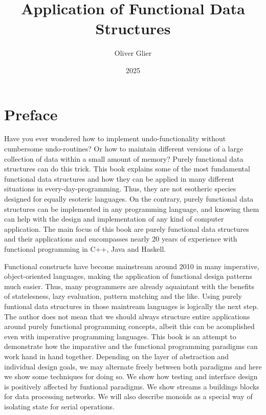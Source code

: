 \documentclass{book}
\title{Application of Functional Data Structures}
\author{Oliver Glier}
\date{2025}
\begin{document}
\maketitle

\tableofcontents

\chapter*{Preface}
Have you ever wondered how to implement undo-functionality without cumbersome undo-routines? Or how to maintain different versions of a large collection of data within a small amount of memory? Purely functional data structures can do this trick. This book explains some of the most fundamental functional data structures and how they can be applied in many different situations in every-day-programming. Thus, they are not esotheric species designed for equally esoteric languages. On the contrary, purely functional data structures can be implemented in any programming language, and knowing them can help with the design and implementation of any kind of computer application. The main focus of this book are purely functional data structures and their applications and encompasses nearly 20 years of experience with functional programming in C++, Java and Haskell. 
\par
Functional constructs have become mainstream around 2010 in many imperative, object-oriented languages, making the application of functional design patterns much easier. Thus, many programmers are already aquaintant with the benefits of statelesness, lazy evaluation, pattern matching and the like.  Using purely funtional data structures in those maintream languages is logically the next step. 
The author does not mean that we should always structure entire applications around purely functional programming concepts, albeit this can be acomplished even with imperative programming languages. This book is an attempt to demonstrate how the imparative and the functional programming paradigms can work hand in hand together. Depending on the layer of abstraction and individual design goals, we may alternate freely between both paradigms and here we show some techniques for doing so. We show how testing and interface design is positively affected by funtional paradigms. We show streams a buildings blocks for data processing networks. We will also describe monoids as a special way of isolating state for serial operations. 
\par
\end{document}
